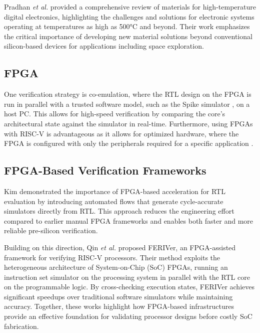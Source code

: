 \documentclass[10pt,twocolumn]{article}
\begin{document}
Pradhan \textit{et al.} \cite{pradhan2024materials} provided a comprehensive review of materials for high-temperature digital electronics, highlighting the challenges and solutions for electronic systems operating at temperatures as high as 500°C and beyond. Their work emphasizes the critical importance of developing new material solutions beyond conventional silicon-based devices for applications including space exploration.

\subsection{FPGA}
One verification strategy is co-emulation, where the RTL design on the FPGA is run in parallel with a trusted software model, such as the Spike simulator \cite{moreno2023fpga}, on a host PC. This allows for high-speed verification by comparing the core's architectural state against the simulator in real-time. Furthermore, using FPGAs with RISC-V is advantageous as it allows for optimized hardware, where the FPGA is configured with only the peripherals required for a specific application \cite{efinix2023riscv}.

\subsection{FPGA-Based Verification Frameworks}

Kim \cite{kim2019fpga} demonstrated the importance of FPGA-based acceleration for RTL evaluation by introducing automated flows that generate cycle-accurate simulators directly from RTL. This approach reduces the engineering effort compared to earlier manual FPGA frameworks and enables both faster and more reliable pre-silicon verification. 

Building on this direction, Qin \textit{et al.} \cite{qin2025feriver} proposed FERIVer, an FPGA-assisted framework for verifying RISC-V processors. Their method exploits the heterogeneous architecture of  System-on-Chip (SoC) FPGAs, running an instruction set simulator on the processing system in parallel with the RTL core on the programmable logic. By cross-checking execution states, FERIVer achieves significant speedups over traditional software simulators while maintaining accuracy. 
Together, these works highlight how FPGA-based infrastructures provide an effective foundation for validating processor designs before costly SoC fabrication.
\end{document}
